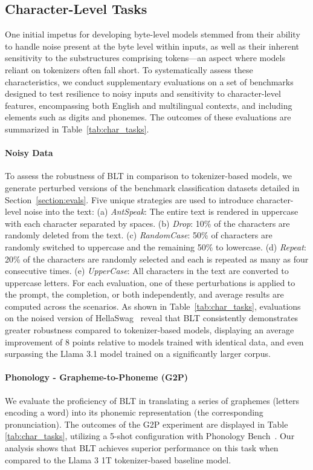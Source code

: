 \subsection{Character-Level Tasks}

One initial impetus for developing byte-level models stemmed from their ability to handle noise present at the byte level within inputs, as well as their inherent sensitivity to the substructures comprising tokens—an aspect where models reliant on tokenizers often fall short. To systematically assess these characteristics, we conduct supplementary evaluations on a set of benchmarks designed to test resilience to noisy inputs and sensitivity to character-level features, encompassing both English and multilingual contexts, and including elements such as digits and phonemes. The outcomes of these evaluations are summarized in Table~\ref{tab:char_tasks}.

\paragraph{Noisy Data} To assess the robustness of {\textsc BLT} in comparison to tokenizer-based models, we generate perturbed versions of the benchmark classification datasets detailed in Section~\ref{section:evals}. Five unique strategies are used to introduce character-level noise into the text: (a) \textit{AntSpeak}: The entire text is rendered in uppercase with each character separated by spaces. (b) \textit{Drop}: 10\% of the characters are randomly deleted from the text. (c) \textit{RandomCase}: 50\% of characters are randomly switched to uppercase and the remaining 50\% to lowercase. (d) \textit{Repeat}: 20\% of the characters are randomly selected and each is repeated as many as four consecutive times. (e) \textit{UpperCase}: All characters in the text are converted to uppercase letters. For each evaluation, one of these perturbations is applied to the prompt, the completion, or both independently, and average results are computed across the scenarios. As shown in Table~\ref{tab:char_tasks}, evaluations on the noised version of HellaSwag~\citep{Eval_hellaswag} reveal that {\textsc BLT} consistently demonstrates greater robustness compared to tokenizer-based models, displaying an average improvement of 8 points relative to models trained with identical data, and even surpassing the Llama 3.1 model trained on a significantly larger corpus.

\paragraph{Phonology - Grapheme-to-Phoneme (G2P)} We evaluate the proficiency of {\textsc BLT} in translating a series of graphemes (letters encoding a word) into its phonemic representation (the corresponding pronunciation). The outcomes of the G2P experiment are displayed in Table \ref{tab:char_tasks}, utilizing a 5-shot configuration with Phonology Bench~\citep{suvarna2024phonologybench}. Our analysis shows that {\textsc BLT} achieves superior performance on this task when compared to the Llama 3 1T tokenizer-based baseline model.

